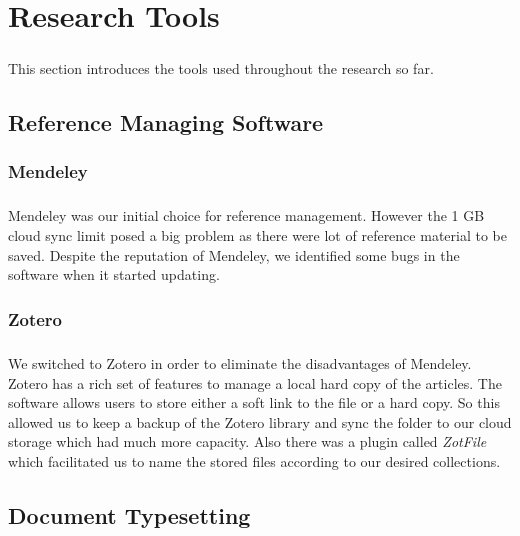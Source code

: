 \chapter{Research Tools}

\paragraph{}
This section introduces the tools used throughout the research so far. 

\section{Reference Managing Software}

\subsection{Mendeley}

\paragraph{}
Mendeley was our initial choice for reference management. However the 1 GB cloud sync limit posed a big problem as there were lot of reference material to be saved. Despite the reputation of Mendeley, we identified some bugs in the software when it started updating. 

\subsection{Zotero}

\paragraph{}
We switched to Zotero in order to eliminate the disadvantages of Mendeley. Zotero has a rich set of features to manage a local hard copy of the articles. The software allows users to store either a soft link to the file or a hard copy. So this allowed us to keep a backup of the Zotero library and sync the folder to our cloud storage which had much more capacity. Also there was a plugin called \emph{ZotFile} which facilitated us to name the stored files according to our desired collections. 

\section{Document Typesetting}

